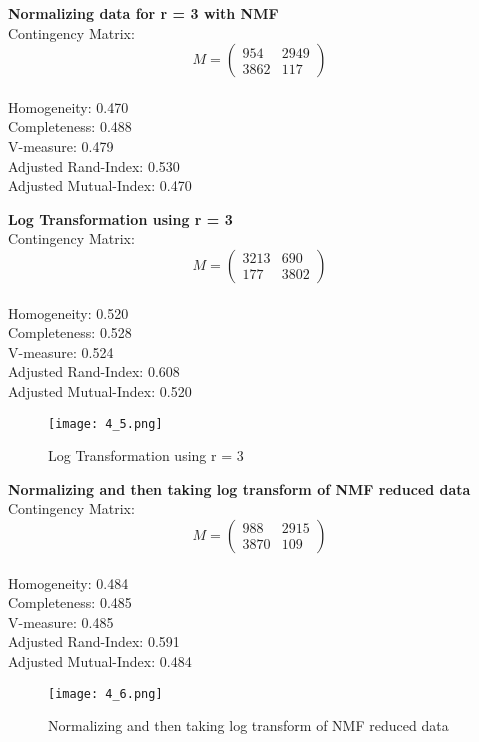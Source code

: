 \documentclass{article}
\begin{document}
\textbf{Normalizing data for r = 3 with NMF}\\
Contingency Matrix:$$ M = \left( \begin{smallmatrix} 954&2949\\ 3862&117 \end{smallmatrix} \right) $$ \\
Homogeneity: 0.470\\
Completeness: 0.488\\
V-measure: 0.479\\
Adjusted Rand-Index: 0.530\\
Adjusted Mutual-Index: 0.470\\
\begin{figure}[h]
	\centering
	\qquad
\end{figure}

\textbf{Log Transformation using r = 3}\\
Contingency Matrix:$$ M = \left( \begin{smallmatrix} 3213&690\\ 177&3802 \end{smallmatrix} \right) $$ \\
Homogeneity: 0.520\\
Completeness: 0.528\\
V-measure: 0.524\\
Adjusted Rand-Index: 0.608\\
Adjusted Mutual-Index: 0.520\\

\begin{figure}[h]
	\centering
	\texttt{[image: 4\_5.png]}
	\caption{Log Transformation using r = 3}
\end{figure}

\textbf{Normalizing and then taking log transform of NMF reduced data}\\
Contingency Matrix:$$ M = \left( \begin{smallmatrix} 988&2915\\ 3870&109 \end{smallmatrix} \right) $$ \\
Homogeneity: 0.484\\
Completeness: 0.485\\
V-measure: 0.485\\
Adjusted Rand-Index: 0.591\\
Adjusted Mutual-Index: 0.484\\
\begin{figure}[h]
	\centering
	\texttt{[image: 4\_6.png]}
	\caption{Normalizing and then taking log transform of NMF reduced data}
\end{figure}
\end{document}
